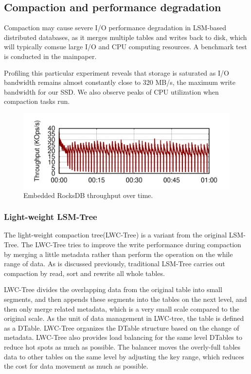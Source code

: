 \documentclass[a4paper,10pt,twoside]{article}
\begin{document}
\subsection{Compaction and performance degradation}
Compaction may cause severe I/O performance degradation in LSM-based distributed databases, 
as it merges multiple tables and writes back to disk, which will typically comsue large I/O and CPU computing resources.
A benchmark test is conducted in the mainpaper.
\par
Profiling this particular experiment reveals that storage is saturated as I/O bandwidth remains almost constantly close to 320 MB/s, the maximum write bandwidth for our SSD. 
We also observe peaks of CPU utilization when compaction tasks run. 
\begin{figure}[h]
    \centering
	\includegraphics[scale=0.3]{Campaction perf.png}
    \caption{Embedded RocksDB throughput over time. \cite{mainpaper}}
    \label{fig:mesh2}
\end{figure}

\subsubsection{Light-weight LSM-Tree}
The light-weight compaction tree(LWC-Tree) \cite{Yao2017ALC} is a variant from the original LSM-Tree. 
The LWC-Tree tries to improve the write performance during compaction by merging a little metadata rather than perform the operation on the while range of data.
As is discussed previously, traditional LSM-Tree carries out compaction by read, sort and rewrite all whole tables. 
\par
LWC-Tree divides the overlapping data from the original table into small segments, and then appends these segments into the tables on the next level, 
and then only merge related metadata, which is a very small scale compared to the original scale. 
As the unit of data management in LWC-tree, the table is defined as a DTable.
LWC-Tree organizes the DTable structure based on the change of metadata. 
LWC-Tree also provides load balancing for the same level DTables to reduce hot spots as much as possible. 
The balancer moves the overly-full tables data to other tables on the same level by adjusting the key range, which reduces the cost for data movement as much as possible.
\end{document}
